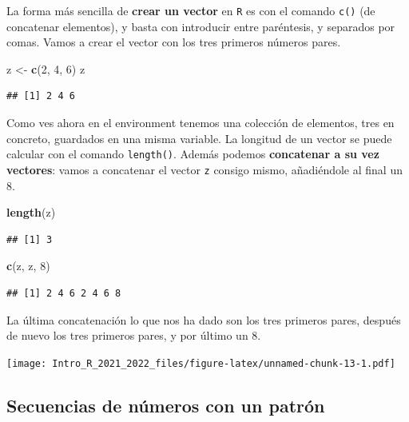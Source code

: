 \documentclass[11pt,]{book}
\newenvironment{Shaded}{\begin{snugshade}}{\end{snugshade}}
\newcommand{\DecValTok}[1]{\textcolor[rgb]{0.06,0.06,0.06}{#1}}
\newcommand{\KeywordTok}[1]{\textcolor[rgb]{0.27,0.27,0.27}{\textbf{#1}}}
\newcommand{\NormalTok}[1]{#1}
\newcommand{\StringTok}[1]{\textcolor[rgb]{0.5,0.5,0.5}{#1}}
\begin{document}
La forma más sencilla de \textbf{crear un vector} en \texttt{R} es con el comando \texttt{c()} (de concatenar elementos), y basta con introducir entre paréntesis, y separados por comas. Vamos a crear el vector con los tres primeros números pares.

\begin{Shaded}
\begin{Highlighting}[]
\NormalTok{z <-}\StringTok{ }\KeywordTok{c}\NormalTok{(}\DecValTok{2}\NormalTok{, }\DecValTok{4}\NormalTok{, }\DecValTok{6}\NormalTok{)}
\NormalTok{z}
\end{Highlighting}
\end{Shaded}

\begin{verbatim}
## [1] 2 4 6
\end{verbatim}

Como ves ahora en el environment tenemos una colección de elementos, tres en concreto, guardados en una misma variable. La longitud de un vector se puede calcular con el comando \texttt{length()}. Además podemos \textbf{concatenar a su vez vectores}: vamos a concatenar el vector \texttt{z} consigo mismo, añadiéndole al final un 8.

\begin{Shaded}
\begin{Highlighting}[]
\KeywordTok{length}\NormalTok{(z)}
\end{Highlighting}
\end{Shaded}

\begin{verbatim}
## [1] 3
\end{verbatim}

\begin{Shaded}
\begin{Highlighting}[]
\KeywordTok{c}\NormalTok{(z, z, }\DecValTok{8}\NormalTok{)}
\end{Highlighting}
\end{Shaded}

\begin{verbatim}
## [1] 2 4 6 2 4 6 8
\end{verbatim}

La última concatenación lo que nos ha dado son los tres primeros pares, después de nuevo los tres primeros pares, y por último un 8.

\texttt{[image: Intro\_R\_2021\_2022\_files/figure-latex/unnamed-chunk-13-1.pdf]}

\hypertarget{secuencias-de-nuxfameros-con-un-patruxf3n}{%
\subsection{Secuencias de números con un patrón}\label{secuencias-de-nuxfameros-con-un-patruxf3n}}
\end{document}
